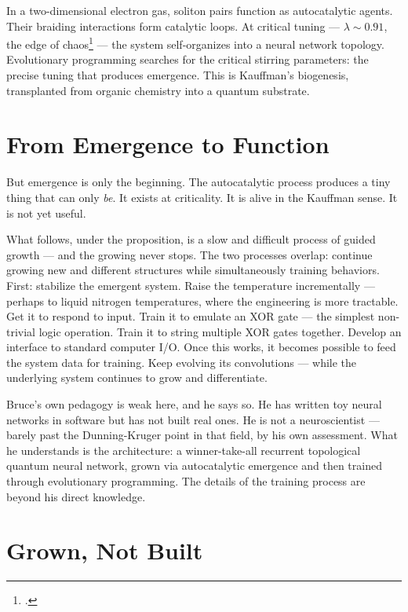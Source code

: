 In a two-dimensional electron gas, soliton pairs function as autocatalytic agents. Their braiding interactions form catalytic loops. At critical tuning --- $\lambda \sim 0.91$, the edge of chaos\footcite{langton1990} --- the system self-organizes into a neural network topology. Evolutionary programming searches for the critical stirring parameters: the precise tuning that produces emergence. This is Kauffman's biogenesis, transplanted from organic chemistry into a quantum substrate.

\section*{From Emergence to Function}
\label{pos12:from-emergence-to-function}

But emergence is only the beginning. The autocatalytic process produces a tiny thing that can only \textit{be}. It exists at criticality. It is alive in the Kauffman sense. It is not yet useful.

What follows, under the proposition, is a slow and difficult process of guided growth --- and the growing never stops. The two processes overlap: continue growing new and different structures while simultaneously training behaviors. First: stabilize the emergent system. Raise the temperature incrementally --- perhaps to liquid nitrogen temperatures, where the engineering is more tractable. Get it to respond to input. Train it to emulate an XOR gate --- the simplest non-trivial logic operation. Train it to string multiple XOR gates together. Develop an interface to standard computer I/O\@. Once this works, it becomes possible to feed the system data for training. Keep evolving its convolutions --- while the underlying system continues to grow and differentiate.

Bruce's own pedagogy is weak here, and he says so. He has written toy neural networks in software but has not built real ones. He is not a neuroscientist --- barely past the Dunning-Kruger point in that field, by his own assessment. What he understands is the architecture: a winner-take-all recurrent topological quantum neural network, grown via autocatalytic emergence and then trained through evolutionary programming. The details of the training process are beyond his direct knowledge.

\section*{Grown, Not Built}
\label{pos12:grown-not-built}

